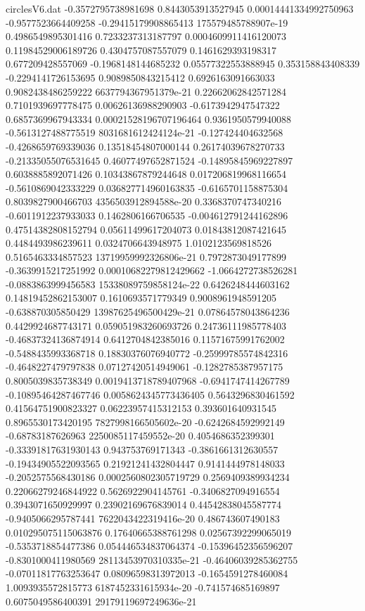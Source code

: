 \begin{filecontents}{circlesV6.dat}
-0.3572795738981698	0.8443053913527945	0.00014441334992750963
-0.9577523664409258	-0.29415179908865413	175579485788907e-19
0.4986549895301416	0.7233237313187797	0.0004609911416120073
0.11984529006189726	0.4304757087557079	0.1461629393198317
0.677209428557069	-0.1968148144685232	0.05577322553888945
0.353158843408339	-0.2294141726153695	0.9089850843215412
0.6926163091663033	0.9082438486259222	6637794367951379e-21
0.22662062842571284	0.7101939697778475	0.00626136988290903
-0.6173942947547322	0.6857369967943334	0.00021528196707196464
0.9361950579940088	-0.5613127488775519	8031681612424124e-21
-0.127424404632568	-0.4268659769339036	0.13518454807000144
0.26174039678270733	-0.21335055076531645	0.46077497652871524
-0.14895845969227897	0.6038885892071426	0.10343867879244648
0.017206819968116654	-0.5610869042333229	0.036827714960163835
-0.6165701158875304	0.8039827900466703	4356503912894588e-20
0.3368370747340216	-0.6011912237933033	0.1462806166706535
-0.004612791244162896	0.47514382808152794	0.05611499617204073
0.01843812087421645	0.4484493986239611	0.0324706643948975
1.0102123569818526	0.5165463334857523	13719959992326806e-21
0.7972873049177899	-0.3639915217251992	0.00010682279812429662
-1.0664272738526281	-0.0883863999456583	15338089759858124e-22
0.6426248444603162	0.14819452862153007	0.1610693571779349
0.9008961948591205	-0.638870305850429	13987625496500429e-21
0.07864578043864236	0.4429924687743171	0.059051983260693726
0.24736111985778403	-0.46837324136874914	0.6412704842385016
0.11571675991762002	-0.5488435993368718	0.18830376076940772
-0.25999785574842316	-0.4648227479797838	0.07127420514949061
-0.1282785387957175	0.8005039835738349	0.0019413718789407968
-0.6941747414267789	-0.10895464287467746	0.0058624345773436405
0.5643296830461592	0.41564751900823327	0.06223957415312153
0.393601640931545	0.8965530173420195	7827998166505602e-20
-0.6242684592992149	-0.68783187626963	2250085117459552e-20
0.4054686352399301	-0.33391817631930143	0.943753769171343
-0.3861661312630557	-0.19434905522093565	0.21921241432804447
0.9141444978148033	-0.2052575568430186	0.0002560802305719729
0.2569409389934234	0.22066279246844922	0.5626922904145761
-0.3406827094916554	0.3943071650929997	0.23902169676839014
0.44542838045587774	-0.9405066295787441	7622043422319416e-20
0.486743607490183	0.010295075115063876	0.17640665388761298
0.02567392299065019	-0.5353718854477386	0.054446534837064374
-0.15396452356596207	-0.8301000411980569	28113453970310335e-21
-0.46406039285362755	-0.07011817763253647	0.08096598313972013
-0.1654591278460084	1.0093935572815773	6187452331615934e-20
-0.741574685169897	0.6075049586400391	29179119697249636e-21

\end{filecontents}
